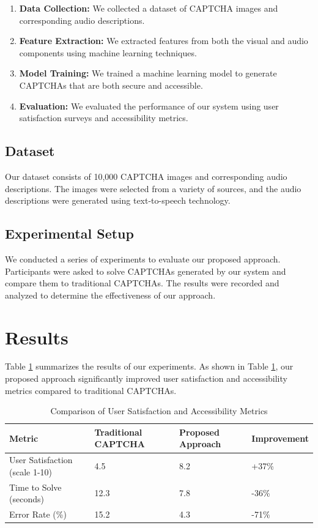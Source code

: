 \documentclass{article}
\begin{document}
\begin{enumerate}
    \item \textbf{Data Collection:} We collected a dataset of CAPTCHA images and corresponding audio descriptions.
    \item \textbf{Feature Extraction:} We extracted features from both the visual and audio components using machine learning techniques.
    \item \textbf{Model Training:} We trained a machine learning model to generate CAPTCHAs that are both secure and accessible.
    \item \textbf{Evaluation:} We evaluated the performance of our system using user satisfaction surveys and accessibility metrics.
\end{enumerate}

\subsection{Dataset}
Our dataset consists of 10,000 CAPTCHA images and corresponding audio descriptions. The images were selected from a variety of sources, and the audio descriptions were generated using text-to-speech technology.

\subsection{Experimental Setup}
We conducted a series of experiments to evaluate our proposed approach. Participants were asked to solve CAPTCHAs generated by our system and compare them to traditional CAPTCHAs. The results were recorded and analyzed to determine the effectiveness of our approach.

\section{Results}\label{sec:results}
Table \ref{tab:results} summarizes the results of our experiments. As shown in Table \ref{tab:results}, our proposed approach significantly improved user satisfaction and accessibility metrics compared to traditional CAPTCHAs.

\begin{table}[ht]
    \centering
    \caption{Comparison of User Satisfaction and Accessibility Metrics}
    \label{tab:results}
    \begin{tabular}{@{}llll@{}}
        \toprule
        \textbf{Metric} & \textbf{Traditional CAPTCHA} & \textbf{Proposed Approach} & \textbf{Improvement} \\
        \midrule
        User Satisfaction (scale 1-10) & 4.5 & 8.2 & +37\% \\
        Time to Solve (seconds) & 12.3 & 7.8 & -36\% \\
        Error Rate (\%) & 15.2 & 4.3 & -71\% \\
        \bottomrule
    \end{tabular}
\end{table}
\end{document}
